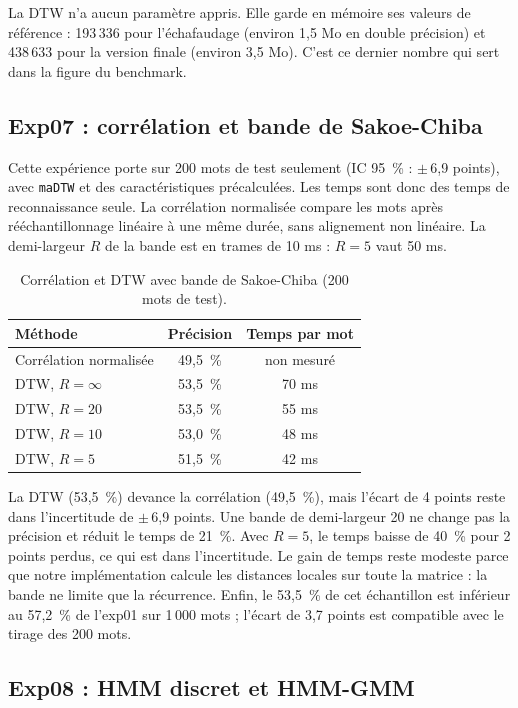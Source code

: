 La DTW n'a aucun paramètre appris. Elle garde en mémoire ses valeurs de référence : 193\,336 pour l'échafaudage (environ 1,5 Mo en double précision) et 438\,633 pour la version finale (environ 3,5 Mo). C'est ce dernier nombre qui sert dans la figure du benchmark.

\subsection{Exp07 : corrélation et bande de Sakoe-Chiba}

Cette expérience porte sur 200 mots de test seulement (IC 95~\% : $\pm$\,6,9 points), avec \texttt{maDTW} et des caractéristiques précalculées. Les temps sont donc des temps de reconnaissance seule. La corrélation normalisée compare les mots après rééchantillonnage linéaire à une même durée, sans alignement non linéaire. La demi-largeur $R$ de la bande est en trames de 10 ms : $R = 5$ vaut 50 ms.

\begin{table}[ht]
  \centering
  \begin{tabular}{lcc}
    \toprule
    Méthode & Précision & Temps par mot\\
    \midrule
    Corrélation normalisée & 49,5~\% & non mesuré\\
    DTW, $R = \infty$ & 53,5~\% & 70 ms\\
    DTW, $R = 20$ & 53,5~\% & 55 ms\\
    DTW, $R = 10$ & 53,0~\% & 48 ms\\
    DTW, $R = 5$ & 51,5~\% & 42 ms\\
    \bottomrule
  \end{tabular}
  \caption{Corrélation et DTW avec bande de Sakoe-Chiba (200 mots de test).}
\end{table}

La DTW (53,5~\%) devance la corrélation (49,5~\%), mais l'écart de 4 points reste dans l'incertitude de $\pm$\,6,9 points. Une bande de demi-largeur 20 ne change pas la précision et réduit le temps de 21~\%. Avec $R = 5$, le temps baisse de 40~\% pour 2 points perdus, ce qui est dans l'incertitude. Le gain de temps reste modeste parce que notre implémentation calcule les distances locales sur toute la matrice : la bande ne limite que la récurrence. Enfin, le 53,5~\% de cet échantillon est inférieur au 57,2~\% de l'exp01 sur 1\,000 mots ; l'écart de 3,7 points est compatible avec le tirage des 200 mots.

\subsection{Exp08 : HMM discret et HMM-GMM}

